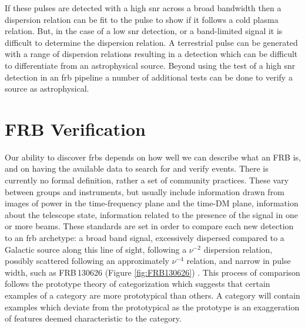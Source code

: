 \documentclass[a4paper,fleqn,usenatbib]{mnras}
\begin{document}
If these pulses are detected with a high \gls{snr} across a broad bandwidth then
a dispersion relation can be fit to the pulse to show if it follows a cold
plasma relation. But, in the case of a low \gls{snr} detection, or a
band-limited signal it is difficult to determine the dispersion relation. A
terrestrial pulse can be generated with a range of dispersion relations
resulting in a detection which can be difficult to differentiate from an
astrophysical source. Beyond using the test of a high \gls{snr} detection in an
\gls{frb} pipeline a number of additional tests can be done to verify a source
as astrophysical.

\section{FRB Verification}
\label{sec:verify_crit}

Our ability to discover \glspl{frb} depends on how well we can describe what an
FRB is, and on having the available data to search for and verify events. There
is currently no formal definition, rather a set of community practices. These
vary between groups and instruments, but usually include information drawn from
images of power in the time-frequency plane and the time-DM plane, information
about the telescope state, information related to the presence of the signal in
one or more beams.  These standards are set in order to compare each new
detection to an \gls{frb} archetype: a broad band signal, excessively dispersed
compared to a Galactic source along this line of sight, following a $\nu^{-2}$
dispersion relation, possibly scattered following an approximately $\nu^{-4}$
relation, and narrow in pulse width, such as FRB\,130626
\citep{2016MNRAS.460L..30C} (Figure \ref{fig:FRB130626}) . This process of
comparison follows the prototype theory of categorization \citep{ROSCH1976382}
which suggests that certain examples of a category are more prototypical than
others. A category will contain examples which deviate from the prototypical as
the prototype is an exaggeration of features deemed characteristic to the
category.
\end{document}
